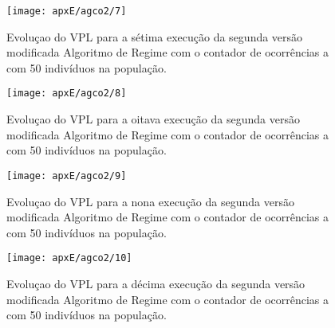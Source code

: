 \begin{figure}[H]
\centering
\texttt{[image: apxE/agco2/7]}
\caption{Evoluçao do VPL para a sétima execução da segunda versão modificada Algoritmo de Regime com o contador de ocorrências a com 50 indivíduos na população.}
\label{fig:graphCO2-07}
\end{figure}

\begin{figure}[H]
\centering
\texttt{[image: apxE/agco2/8]}
\caption{Evoluçao do VPL para a oitava execução da segunda versão modificada Algoritmo de Regime com o contador de ocorrências a com 50 indivíduos na população.}
\label{fig:graphCO2-08}
\end{figure}

\begin{figure}[H]
\centering
\texttt{[image: apxE/agco2/9]}
\caption{Evoluçao do VPL para a nona execução da segunda versão modificada Algoritmo de Regime com o contador de ocorrências a com 50 indivíduos na população.}
\label{fig:graphCO2-09}
\end{figure}

\begin{figure}[H]
\centering
\texttt{[image: apxE/agco2/10]}
\caption{Evoluçao do VPL para a décima execução da segunda versão modificada Algoritmo de Regime com o contador de ocorrências a com 50 indivíduos na população.}
\label{fig:graphCO2-10}
\end{figure}